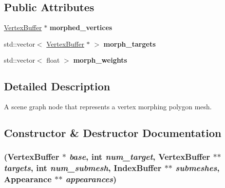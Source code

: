 \subsection*{Public Attributes}
\begin{CompactItemize}
\item 
\hypertarget{classm3g_1_1MorphingMesh_76c5d624bf40e238c8b3a1fdeb9097ea}{
\hyperlink{classm3g_1_1VertexBuffer}{VertexBuffer} $\ast$ \textbf{morphed\_\-vertices}}
\label{classm3g_1_1MorphingMesh_76c5d624bf40e238c8b3a1fdeb9097ea}

\item 
\hypertarget{classm3g_1_1MorphingMesh_b24428696ee82ba6062934a0f21501dd}{
std::vector$<$ \hyperlink{classm3g_1_1VertexBuffer}{VertexBuffer} $\ast$ $>$ \textbf{morph\_\-targets}}
\label{classm3g_1_1MorphingMesh_b24428696ee82ba6062934a0f21501dd}

\item 
\hypertarget{classm3g_1_1MorphingMesh_712adba14558405c12e3162083164c7e}{
std::vector$<$ float $>$ \textbf{morph\_\-weights}}
\label{classm3g_1_1MorphingMesh_712adba14558405c12e3162083164c7e}

\end{CompactItemize}


\subsection{Detailed Description}
A scene graph node that represents a vertex morphing polygon mesh. 

\subsection{Constructor \& Destructor Documentation}
\hypertarget{classm3g_1_1MorphingMesh_211192cdba0b1d136977403ba4ed0d0c}{
\subsubsection[{MorphingMesh}]{ ({\bf VertexBuffer} $\ast$ {\em base}, \/  int {\em num\_\-target}, \/  {\bf VertexBuffer} $\ast$$\ast$ {\em targets}, \/  int {\em num\_\-submesh}, \/  {\bf IndexBuffer} $\ast$$\ast$ {\em submeshes}, \/  {\bf Appearance} $\ast$$\ast$ {\em appearances})}}
\label{classm3g_1_1MorphingMesh_211192cdba0b1d136977403ba4ed0d0c}


